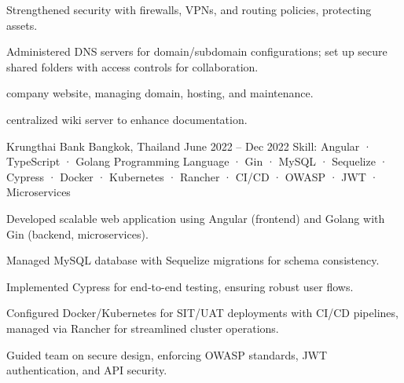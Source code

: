 \begin{cventries}
{\begin{cvitems}
      \item { Strengthened security with firewalls, VPNs, and routing policies, protecting assets.}
      \item { Administered DNS servers for domain/subdomain configurations; set up secure shared folders with access controls for collaboration.}
      \item { company website, managing domain, hosting, and maintenance.}
      \item { centralized wiki server to enhance documentation.}
      \end{cvitems}
    }

    {Krungthai Bank} %
    {Bangkok, Thailand} %
    {June 2022 -- Dec 2022} %
    {Skill: Angular · TypeScript · Golang Programming Language · Gin · MySQL · Sequelize · Cypress · Docker · Kubernetes · Rancher · CI/CD · OWASP · JWT · Microservices} %
    {
    \begin{cvitems} %
      \item {Developed scalable web application using Angular (frontend) and Golang with Gin (backend, microservices).}
      \item {Managed MySQL database with Sequelize migrations for schema consistency.}
      \item {Implemented Cypress for end-to-end testing, ensuring robust user flows.}
      \item {Configured Docker/Kubernetes for SIT/UAT deployments with CI/CD pipelines, managed via Rancher for streamlined cluster operations.}
      \item {Guided team on secure design, enforcing OWASP standards, JWT authentication, and API security.}
    \end{cvitems}
  }


\end{cventries}
